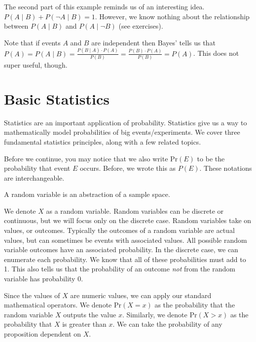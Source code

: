\documentclass[main.tex]{subfiles}
\begin{document}
\begin{rem}
	The second part of this example reminds us of an interesting idea. \(P(A \mid B) + P(\lnot A \mid B) = 1\). However, we know nothing about the relationship between \(P(A \mid B)\) and \(P(A \mid \lnot B)\) (see exercises).
\end{rem}

Note that if events \(A\) and \(B\) are independent then Bayes' tells us that \(P(A) = P(A \mid B) = \frac{P(B \mid A) \cdot P(A)}{P(B)} = \frac{P(B) \cdot P(A)}{P(B)} = P(A)\). This does not super useful, though.

\section{Basic Statistics}

Statistics are an important application of probability. Statistics give us a way to mathematically model probabilities of big events/experiments. We cover three fundamental statistics principles, along with a few related topics.

\begin{rem}
	Before we continue, you may notice that we also write \(\mathrm{Pr}(E)\) to be the probability that event \(E\) occurs. Before, we wrote this as \(P(E)\). These notations are interchangeable.
\end{rem}

\begin{defn}
	A random variable is an abstraction of a sample space.
\end{defn}

We denote \(X\) as a random variable. Random variables can be discrete or continuous, but we will focus only on the discrete case. Random variables take on values, or outcomes. Typically the outcomes of a random variable are actual values, but can sometimes be events with associated values. All possible random variable outcomes have an associated probability. In the discrete case, we can enumerate each probability. We know that all of these probabilities must add to 1. This also tells us that the probability of an outcome \textit{not} from the random variable has probability 0.

Since the values of \(X\) are numeric values, we can apply our standard mathematical operators. We denote \(\mathrm{Pr}(X = x)\) as the probability that the random variable \(X\) outputs the value \(x\). Similarly, we denote \(\mathrm{Pr}(X > x)\) as the probability that \(X\) is greater than \(x\). We can take the probability of any proposition dependent on \(X\).
\end{document}
